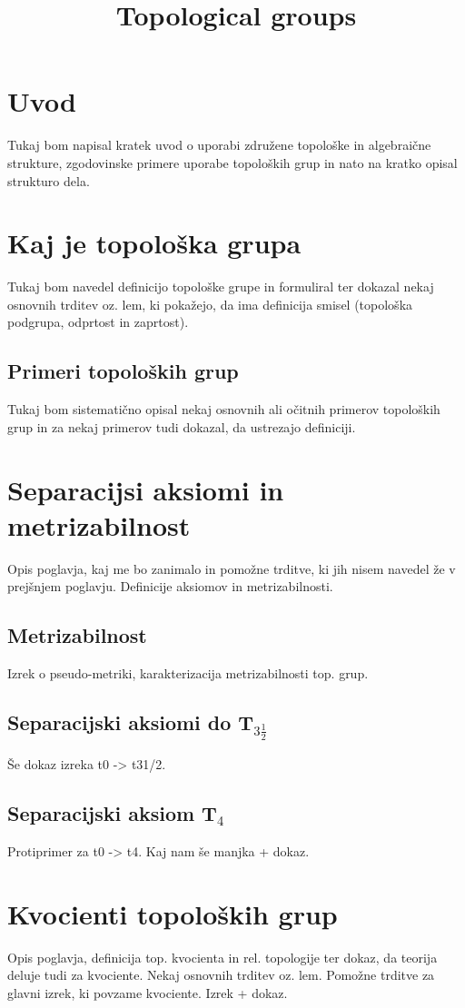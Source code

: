 \documentclass[mat1]{fmfdelo}
\title{Topological groups}
\begin{document}
\section{Uvod}
Tukaj bom napisal kratek uvod o uporabi združene topološke in algebraične strukture, zgodovinske primere uporabe topoloških grup in nato na kratko opisal strukturo dela.

\section{Kaj je topološka grupa}
Tukaj bom navedel definicijo topološke grupe in formuliral ter dokazal nekaj osnovnih trditev oz. lem, ki pokažejo, da ima definicija smisel (topološka podgrupa, odprtost in zaprtost).

\subsection{Primeri topoloških grup}
Tukaj bom sistematično opisal nekaj osnovnih ali očitnih primerov topoloških grup in za nekaj primerov tudi dokazal, da ustrezajo definiciji.

\section{Separacijsi aksiomi in metrizabilnost}
Opis poglavja, kaj me bo zanimalo in pomožne trditve, ki jih nisem navedel že v prejšnjem poglavju.
Definicije aksiomov in metrizabilnosti.

\subsection{Metrizabilnost}
Izrek o pseudo-metriki, karakterizacija metrizabilnosti top. grup.

\subsection{Separacijski aksiomi do T$_{3 \frac{1}{2}}$}
Še dokaz izreka t0 -> t31/2.

\subsection{Separacijski aksiom T$_4$}
Protiprimer za t0 -> t4. Kaj nam še manjka + dokaz.

\section{Kvocienti topoloških grup}
Opis poglavja, definicija top. kvocienta in rel. topologije ter dokaz, da teorija deluje tudi za kvociente.
Nekaj osnovnih trditev oz. lem.
Pomožne trditve za glavni izrek, ki povzame kvociente.
Izrek + dokaz.
\end{document}
